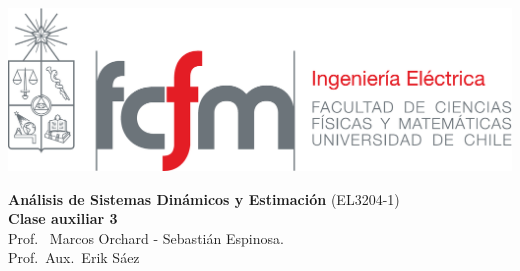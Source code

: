 \documentclass[
  11pt,
  letterpaper,
   addpoints,
   answers
  ]{exam}
\begin{document}
\pagestyle{headandfoot}
\firstpageheader{}{}{}
\runningheader{}{}{}
\firstpagefooter{}{\thepage}{}
\runningfooter{}{\thepage}{}

\noindent
\begin{minipage}{0.47\textwidth}
\includegraphics[width=\textwidth]{../fcfm_die}
\end{minipage}
\begin{minipage}{0.53\textwidth}
\begin{center}
\large\textbf{Análisis de Sistemas Dinámicos y Estimación} (EL3204-1) \\
\large\textbf{Clase auxiliar 3} \\
\normalsize Prof.~ Marcos Orchard - Sebastián Espinosa.\\
\normalsize Prof.~Aux.~Erik Sáez
\end{center}
\end{minipage}

\vspace{0.5cm}
\noindent
\vspace{.85cm}
\end{document}
